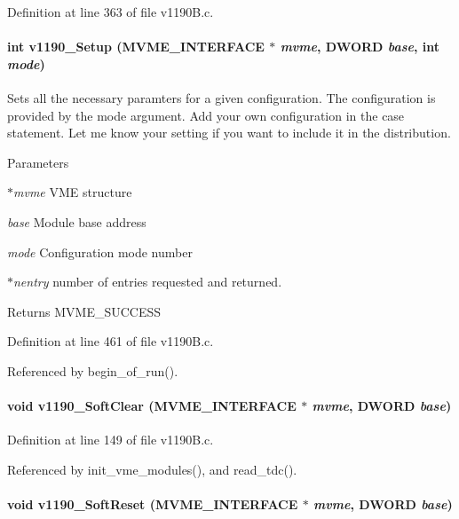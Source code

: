 Definition at line 363 of file v1190B.c.
\paragraph[{v1190\_\-Setup}]{\setlength{\rightskip}{0pt plus 5cm}int v1190\_\-Setup ({\bf MVME\_\-INTERFACE} $\ast$ {\em mvme}, \/  {\bf DWORD} {\em base}, \/  int {\em mode})}\hfill\label{v1190B_8h_a08c507c60af774a2828a1e0ff6eac4c2}
Sets all the necessary paramters for a given configuration. The configuration is provided by the mode argument. Add your own configuration in the case statement. Let me know your setting if you want to include it in the distribution. 
\begin{DoxyParams}{Parameters}
\item[{\em $\ast$mvme}]VME structure \item[{\em base}]Module base address \item[{\em mode}]Configuration mode number \item[{\em $\ast$nentry}]number of entries requested and returned. \end{DoxyParams}
\begin{DoxyReturn}{Returns}
MVME\_\-SUCCESS 
\end{DoxyReturn}


Definition at line 461 of file v1190B.c.

Referenced by begin\_\-of\_\-run().
\paragraph[{v1190\_\-SoftClear}]{\setlength{\rightskip}{0pt plus 5cm}void v1190\_\-SoftClear ({\bf MVME\_\-INTERFACE} $\ast$ {\em mvme}, \/  {\bf DWORD} {\em base})}\hfill\label{v1190B_8h_a3aab280a7becfaf91a6e5fd274c87a6f}


Definition at line 149 of file v1190B.c.

Referenced by init\_\-vme\_\-modules(), and read\_\-tdc().
\paragraph[{v1190\_\-SoftReset}]{\setlength{\rightskip}{0pt plus 5cm}void v1190\_\-SoftReset ({\bf MVME\_\-INTERFACE} $\ast$ {\em mvme}, \/  {\bf DWORD} {\em base})}\hfill\label{v1190B_8h_a54b6135b6e898ce8f53efc28f9d21925}



